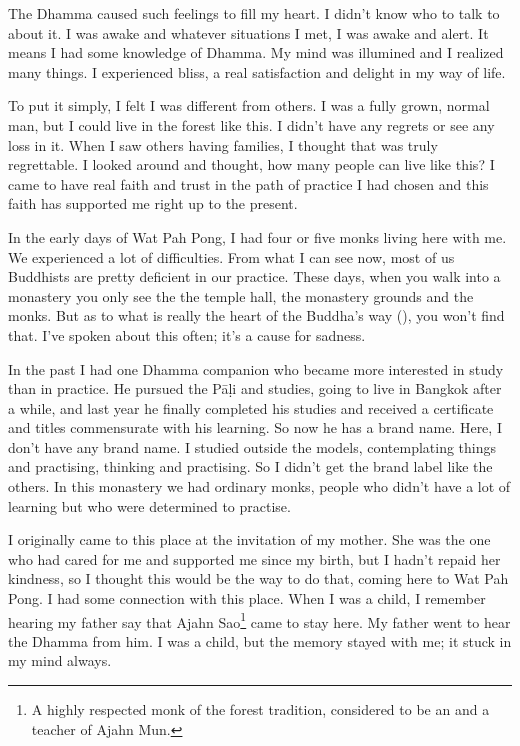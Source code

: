 The Dhamma caused such feelings to fill my heart. I didn't know who to talk to about it. I was awake and whatever situations I met, I was awake and alert. It means I had some knowledge of Dhamma. My mind was illumined and I realized many things. I experienced bliss, a real satisfaction and delight in my way of life. 

To put it simply, I felt I was different from others. I was a fully grown, normal man, but I could live in the forest like this. I didn't have any regrets or see any loss in it. When I saw others having families, I thought that was truly regrettable. I looked around and thought, how many people can live like this? I came to have real faith and trust in the path of practice I had chosen and this faith has supported me right up to the present. 

In the early days of Wat Pah Pong, I had four or five monks living here with me. We experienced a lot of difficulties. From what I can see now, most of us Buddhists are pretty deficient in our practice. These days, when you walk into a monastery you only see the  the temple hall, the monastery grounds and the monks. But as to what is really the heart of the Buddha's way (), you won't find that. I've spoken about this often; it's a cause for sadness. 

In the past I had one Dhamma companion who became more interested in study than in practice. He pursued the P\=a\d{l}i and  studies, going to live in Bangkok after a while, and last year he finally completed his studies and received a certificate and titles commensurate with his learning. So now he has a brand name. Here, I don't have any brand name. I studied outside the models, contemplating things and practising, thinking and practising. So I didn't get the brand label like the others. In this monastery we had ordinary monks, people who didn't have a lot of learning but who were determined to practise. 

I originally came to this place at the invitation of my mother. She was the one who had cared for me and supported me since my birth, but I hadn't repaid her kindness, so I thought this would be the way to do that, coming here to Wat Pah Pong. I had some connection with this place. When I was a child, I remember hearing my father say that Ajahn Sao\footnote{A highly respected monk of the forest tradition, considered to be an  and a teacher of Ajahn Mun.} came to stay here. My father went to hear the Dhamma from him. I was a child, but the memory stayed with me; it stuck in my mind always. 

